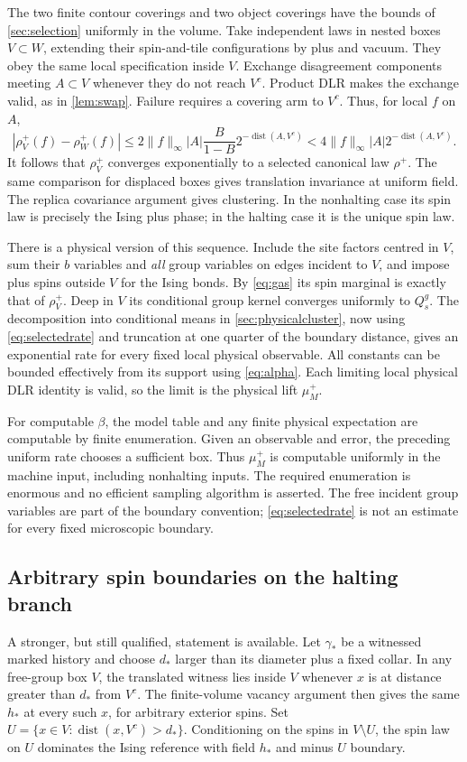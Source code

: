 \documentclass[11pt,reqno]{amsart}
\numberwithin{equation}{section}
\theoremstyle{definition}
\theoremstyle{remark}
\newcommand{\dist}{\operatorname{dist}}
\newcommand{\norm}[1]{\lVert#1\rVert}
\begin{document}
The two finite contour coverings and two object coverings have the bounds of \cref{sec:selection} uniformly in the volume. Take independent laws in nested boxes $V\subset W$, extending their spin-and-tile configurations by plus and vacuum. They obey the same local specification inside $V$. Exchange disagreement components meeting $A\subset V$ whenever they do not reach $V^c$. Product DLR makes the exchange valid, as in \cref{lem:swap}. Failure requires a covering arm to $V^c$. Thus, for local $f$ on $A$,
\begin{equation}\label{eq:selectedrate}
 |\rho_V^+(f)-\rho_W^+(f)|
 \leq2\norm f_\infty |A|\frac B{1-B}2^{-\dist(A,V^c)}
 <4\norm f_\infty |A|2^{-\dist(A,V^c)}.
\end{equation}
It follows that $\rho_V^+$ converges exponentially to a selected canonical law $\rho^+$. The same comparison for displaced boxes gives translation invariance at uniform field. The replica covariance argument gives clustering. In the nonhalting case its spin law is precisely the Ising plus phase; in the halting case it is the unique spin law.

There is a physical version of this sequence. Include the site factors centred in $V$, sum their $b$ variables and \emph{all} group variables on edges incident to $V$, and impose plus spins outside $V$ for the Ising bonds. By \eqref{eq:gas} its spin marginal is exactly that of $\rho_V^+$. Deep in $V$ its conditional group kernel converges uniformly to $Q_s^g$. The decomposition into conditional means in \cref{sec:physicalcluster}, now using \eqref{eq:selectedrate} and truncation at one quarter of the boundary distance, gives an exponential rate for every fixed local physical observable. All constants can be bounded effectively from its support using \eqref{eq:alpha}. Each limiting local physical DLR identity is valid, so the limit is the physical lift $\mu_M^+$.

For computable $\beta$, the model table and any finite physical expectation are computable by finite enumeration. Given an observable and error, the preceding uniform rate chooses a sufficient box. Thus $\mu_M^+$ is computable uniformly in the machine input, including nonhalting inputs. The required enumeration is enormous and no efficient sampling algorithm is asserted. The free incident group variables are part of the boundary convention; \eqref{eq:selectedrate} is not an estimate for every fixed microscopic boundary.

\subsection{Arbitrary spin boundaries on the halting branch}\label{sec:arbspin}
A stronger, but still qualified, statement is available. Let $\gamma_*$ be a witnessed marked history and choose $d_*$ larger than its diameter plus a fixed collar. In any free-group box $V$, the translated witness lies inside $V$ whenever $x$ is at distance greater than $d_*$ from $V^c$. The finite-volume vacancy argument then gives the same $h_*$ at every such $x$, for arbitrary exterior spins. Set $U=\{x\in V:\dist(x,V^c)>d_*\}$. Conditioning on the spins in $V\setminus U$, the spin law on $U$ dominates the Ising reference with field $h_*$ and minus $U$ boundary.
\end{document}
